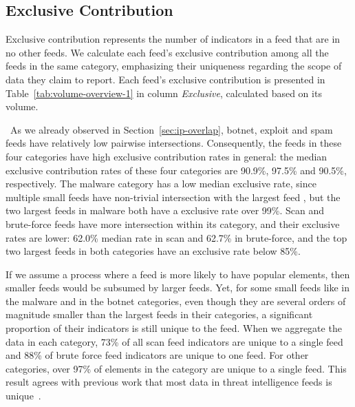 \subsection{Exclusive Contribution}
\label{sec:ip-unique}

Exclusive contribution represents the number of indicators in a feed that are in no other feeds. We calculate each feed's exclusive contribution among all the feeds in the same category, emphasizing their uniqueness regarding the scope of data they claim to report. Each feed's exclusive contribution is presented in Table~\ref{tab:volume-overview-1} in column \emph{Exclusive}, calculated based on its volume.

\finding\ As we already observed in Section~\ref{sec:ip-overlap}, botnet, exploit and spam feeds have relatively low pairwise intersections. Consequently, the feeds in these four categories have high exclusive contribution rates in general: the median exclusive contribution rates of these four categories are 90.9\%, 97.5\% and 90.5\%, respectively. The malware category has a low median exclusive rate, since multiple small feeds have non-trivial intersection with the largest feed {\feedetiprep}, but the two largest feeds in malware both have a exclusive rate over 99\%. Scan and brute-force feeds have more intersection within its category, and their exclusive rates are lower: 62.0\% median rate in scan and 62.7\% in brute-force, and the top two largest feeds in both categories have an exclusive rate below 85\%.

If we assume a process where a feed is more likely to have popular elements, then smaller feeds would be subsumed by larger feeds. Yet, for some small feeds like {\feedmalcode} in the malware and {\feedTSHoneypot} in the botnet categories, even though they are several orders of magnitude smaller than the largest feeds in their categories, a significant proportion of their indicators is still unique to the feed. When we aggregate the data in each category, 73\% of all scan feed indicators are unique to a single feed and 88\% of brute force feed indicators are unique to one feed. For other categories, over 97\% of elements in the category are unique to a single feed. This result agrees with previous work that most data in threat intelligence feeds is unique~\cite{metcalf2015blacklist,thomas2016abuse}.
